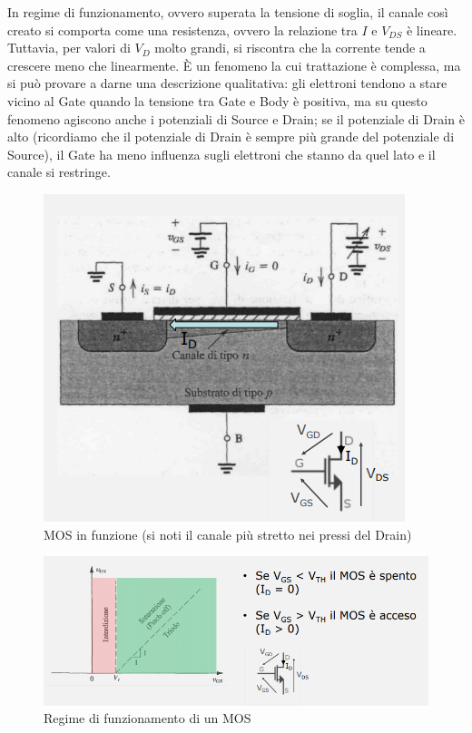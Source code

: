 \documentclass{article}
\begin{document}
In regime di funzionamento, ovvero superata la tensione di soglia, il canale così creato si comporta come una resistenza, ovvero la relazione tra $I$ e $V_{DS}$ è lineare. Tuttavia, per valori di $V_D$ molto grandi, si riscontra che la corrente tende a crescere meno che linearmente. È un fenomeno la cui trattazione è complessa, ma si può provare a darne una descrizione qualitativa: gli elettroni tendono a stare vicino al Gate quando la tensione tra Gate e Body è positiva, ma su questo fenomeno agiscono anche i potenziali di Source e Drain; se il potenziale di Drain è alto (ricordiamo che il potenziale di Drain è sempre più grande del potenziale di Source), il Gate ha meno influenza sugli elettroni che stanno da quel lato e il canale si restringe.
\clearpage 
\begin{figure}[h]
  \centering
  \includegraphics[scale=0.7]{IM_MOS_ter}
  \caption{MOS in funzione (si noti il canale più stretto nei pressi del Drain)}
  \label{Schema_MOS_ter}
\end{figure}

\begin{figure}[h]
  \centering
  \includegraphics[scale=0.7]{IM_MOS_Funzionamento}
  \caption{Regime di funzionamento di un MOS}
  \label{Schema_MOS_Funzionamento}
\end{figure}
\end{document}
